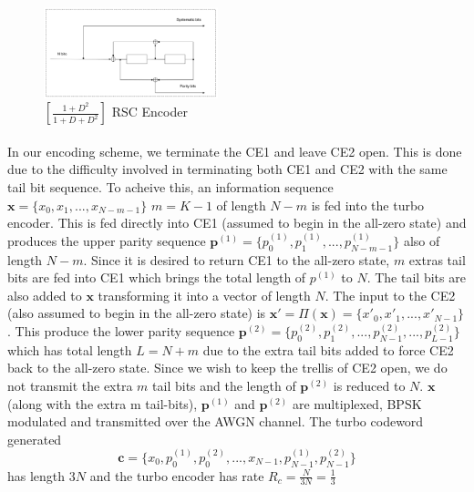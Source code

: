 \documentclass[twocolumn]{article}
\begin{document}
\begin{figure}[h!]
\centering
		\includegraphics[width=0.45\textwidth]{RSCExample3.pdf}
		\caption{$[\frac{1+D^2}{1+D+D^2}]$  RSC Encoder}
		\label{RSC}
		\end{figure}

\paragraph{}
In our encoding scheme, we terminate the CE1 and leave CE2 open. This is done due
to the difficulty involved in terminating both CE1 and CE2 with the same tail bit 
sequence.
To acheive this,	
 an information sequence $\mathbf{x}=\{x_0,x_1,...,x_{N-m-1} \} $
$m=K-1$
of length $N-m$ is fed into the turbo encoder. This is fed directly into CE1 (assumed to 
begin in the all-zero state) and produces the upper parity sequence 
$\mathbf{p}^{(1)}=\{p^{(1)}_0,p^{(1)}_1,...,p^{(1)}_{N-m-1} \}$ also of 
length $N-m$. 
Since it is desired to return CE1 to the all-zero state, $m$ extras tail bits 
are fed into CE1 which brings the total length of $p^{(1)}$ to $N$. The tail bits are
also added to $\mathbf{x}$ transforming it into a vector of length $N$.
The input to the CE2 (also assumed to 
begin in the all-zero state) is 
$\mathbf{x'}=\Pi(\mathbf{x})= \{x'_0,x'_1,...,x'_{N-1} \} $. This produce the lower 
parity sequence 
$\mathbf{p}^{(2)}=\{p^{(2)}_0,p^{(2)}_1,...,p^{(2)}_{N-1},...,p^{(2)}_{L-1} \}$
 which has total length $L=N+m$ due to the extra tail bits added to force CE2 back to the
 all-zero state. Since we wish to keep the trellis of CE2 open, we do not transmit the
 extra $m$ tail bits and the length of $\mathbf{p}^{(2)}$ is reduced to $N$.
 $\mathbf{x}$ (along with the extra m tail-bits), $\mathbf{p}^{(1)}$
 and $\mathbf{p}^{(2)}$ are multiplexed, BPSK modulated and transmitted over the
 AWGN channel.
 The turbo codeword generated  
 $$\mathbf{c}=\{x_0,p^{(1)}_0,p^{(2)}_0,...,x_{N-1},p^{(1)}_{N-1},p^{(2)}_{N-1} \} $$ 
 has length $3N$ and the
 turbo encoder has rate $R_c=\frac{N}{3N} = \frac{1}{3}$
 
 
\end{document}
